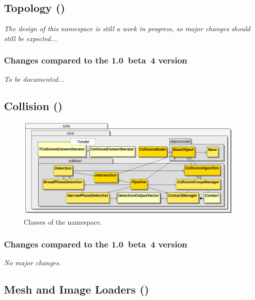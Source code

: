 \subsection{Topology ()}

\textit{The design of this namespace is still a work in progress, so major changes should still be expected...}

\subsubsection{Changes compared to the 1.0~beta~4 version}

\textit{To be documented...}

\subsection{Collision ()}

\begin{figure}[h]
\centering
\includegraphics[scale=.33]{../classdiagrams/sofacore-collision.png}
\caption{Classes of the  namespace.}
\label{fig:uml-sofa-core-collision}
\end{figure}

\subsubsection{Changes compared to the 1.0~beta~4 version}

\textit{No major changes.}

\subsection{Mesh and Image Loaders ()}

